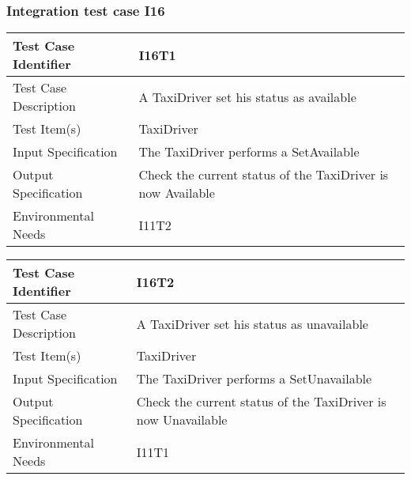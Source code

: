 		\subsubsection{Integration test case I16}
		\begin{center}
			\begin{tabular}{ |l p{10cm}| } \hline
				Test Case Identifier & I16T1 \\ \hline
				Test Case Description & A TaxiDriver set his status as available  \\ \hline
				Test Item(s) & TaxiDriver \\ \hline
				Input Specification & The TaxiDriver performs a SetAvailable \\ \hline
				Output Specification & Check the current status of the TaxiDriver is now Available \\ \hline
				Environmental Needs & I11T2 \\ \hline
			\end{tabular}
		\end{center}
		\begin{center}
			\begin{tabular}{ |l p{10cm}| } \hline
				Test Case Identifier & I16T2 \\ \hline
				Test Case Description & A TaxiDriver set his status as unavailable  \\ \hline
				Test Item(s) & TaxiDriver \\ \hline
				Input Specification & The TaxiDriver performs a SetUnavailable \\ \hline
				Output Specification & Check the current status of the TaxiDriver is now Unavailable \\ \hline
				Environmental Needs & I11T1 \\ \hline
			\end{tabular}
		\end{center}
